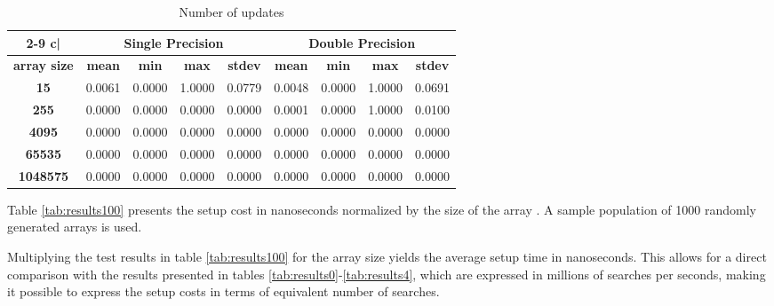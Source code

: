 \documentclass[preprint,1p,times]{elsarticle}
\begin{document}
\begin{table}[ht]
	\footnotesize
	\centering
	\begin{tabular}{| c | c c c c | c c c c |}
		\cline{2-9}
		\multicolumn{1} {c|}{}  & \multicolumn{4}{c|}{\textbf{Single Precision}}  & \multicolumn{4}{c|}{\textbf{Double Precision}} \\
		\hline
		\textbf{array size} & \textbf{mean} & \textbf{min} & \textbf{max} & \textbf{stdev} & \textbf{mean} & \textbf{min} & \textbf{max} & \textbf{stdev} \\
		\hline
		\multicolumn{1}{|c|}{\textbf{15}                                    } &     0.0061 &     0.0000 &     1.0000 &     0.0779 &     0.0048 &     0.0000 &     1.0000 &     0.0691 \\
		\multicolumn{1}{|c|}{\textbf{255}                                   } &     0.0000 &     0.0000 &     0.0000 &     0.0000 &     0.0001 &     0.0000 &     1.0000 &     0.0100 \\
		\multicolumn{1}{|c|}{\textbf{4095}                                  } &     0.0000 &     0.0000 &     0.0000 &     0.0000 &     0.0000 &     0.0000 &     0.0000 &     0.0000 \\
		\multicolumn{1}{|c|}{\textbf{65535}                                 } &     0.0000 &     0.0000 &     0.0000 &     0.0000 &     0.0000 &     0.0000 &     0.0000 &     0.0000 \\
		\multicolumn{1}{|c|}{\textbf{1048575}                               } &     0.0000 &     0.0000 &     0.0000 &     0.0000 &     0.0000 &     0.0000 &     0.0000 &     0.0000 \\
		\hline
	\end{tabular}
	\caption{Number of  updates}
	\label{tab:results101}
\end{table}

Table \ref{tab:results100} presents the setup cost in nanoseconds normalized by the size of the array . A sample population of 1000 randomly generated arrays  is used.

Multiplying the test results in table \ref{tab:results100} for the array size yields the average setup time in nanoseconds. This allows for a direct comparison with the results presented in tables  \ref{tab:results0}-\ref{tab:results4}, which are expressed in millions of searches per seconds, making it possible to express the setup costs in terms of equivalent number of searches.
\end{document}
